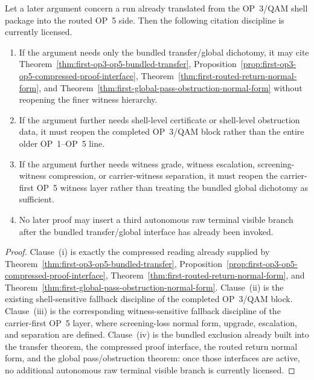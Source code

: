 \begin{proposition}
\label{prop:citation-reopening-rule-bundled-op3-op5-global}
Let a later argument concern a run already translated from the OP~3/QAM shell package into the routed OP~5 side. Then the following citation discipline is currently licensed.
\begin{enumerate}[leftmargin=2em,label=(\roman*)]
  \item If the argument needs only the bundled transfer/global dichotomy, it may cite Theorem~\ref{thm:first-op3-op5-bundled-transfer}, Proposition~\ref{prop:first-op3-op5-compressed-proof-interface}, Theorem~\ref{thm:first-routed-return-normal-form}, and Theorem~\ref{thm:first-global-pass-obstruction-normal-form} without reopening the finer witness hierarchy.
  \item If the argument further needs shell-level certificate or shell-level obstruction data, it must reopen the completed OP~3/QAM block rather than the entire older OP~1--OP~5 line.
  \item If the argument further needs witness grade, witness escalation, screening-witness compression, or carrier-witness separation, it must reopen the carrier-first OP~5 witness layer rather than treating the bundled global dichotomy as sufficient.
  \item No later proof may insert a third autonomous raw terminal visible branch after the bundled transfer/global interface has already been invoked.
\end{enumerate}
\end{proposition}

\begin{proof}
Clause~(i) is exactly the compressed reading already supplied by Theorem~\ref{thm:first-op3-op5-bundled-transfer}, Proposition~\ref{prop:first-op3-op5-compressed-proof-interface}, Theorem~\ref{thm:first-routed-return-normal-form}, and Theorem~\ref{thm:first-global-pass-obstruction-normal-form}. Clause~(ii) is the existing shell-sensitive fallback discipline of the completed OP~3/QAM block. Clause~(iii) is the corresponding witness-sensitive fallback discipline of the carrier-first OP~5 layer, where screening-loss normal form, upgrade, escalation, and separation are defined. Clause~(iv) is the bundled exclusion already built into the transfer theorem, the compressed proof interface, the routed return normal form, and the global pass/obstruction theorem: once those interfaces are active, no additional autonomous raw terminal visible branch is currently licensed.
\end{proof}

